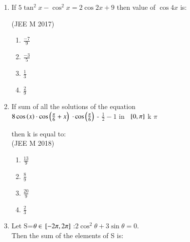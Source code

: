 \begin{enumerate}[label=\thesubsection.\arabic*,ref=\thesubsection.\theenumi]
\item If $5${$\tan^2x-\cos^2x=2\cos2x+9$} then value of $\cos 4x$ is:

\hfill{(JEE M 2017)}\\
    \begin{enumerate}
    \item $\frac{-7}{9}$ 
    \item $\frac{-3}{5}$
    \item $\frac{1}{3}$
    \item $\frac{2}{9}$\\
    \end{enumerate}
 \item If sum of all the solutions of the equation\\
  $8 \cos\left(x\right) \cdot \cos\left(\frac{\pi}{6} + x \right)$ $\cdot \cos \left(\frac{\pi}{6}\right)$ - $\frac{1}{2} - 1 \text{ in }$ ${}\left[0, \pi\right]$ k $\pi$

 then k is equal to:\\
 
\hfill{(JEE M 2018)}\\
\begin{enumerate}
\item $\frac{13}{9}$
\item $\frac{8}{9}$\\
\item  $\frac{20}{9}$
\item  $\frac{2}{3}$\\
\end{enumerate}
\item Let S=$\theta \in {}\left[-2\pi, 2\pi\right]$ :$2\cos^2\theta + 3\sin\theta=0.$\\
 Then the sum of the elements of S is:\\
 

\end{enumerate}
